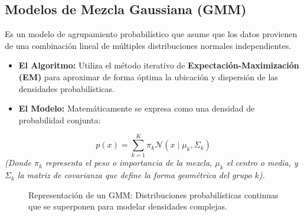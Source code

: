 \subsection{Modelos de Mezcla Gaussiana (GMM)}
Es un modelo de agrupamiento probabilístico que asume que los datos provienen de una combinación lineal de múltiples distribuciones normales independientes.

\begin{itemize}
    \item \textbf{El Algoritmo:} Utiliza el método iterativo de \textbf{Expectación-Maximización (EM)} para aproximar de forma óptima la ubicación y dispersión de las densidades probabilísticas.
    \item \textbf{El Modelo:} Matemáticamente se expresa como una densidad de probabilidad conjunta:
\end{itemize}
\begin{equation}
    p(x) = \sum_{k=1}^{K} \pi_k \mathcal{N}(x \mid \mu_k, \Sigma_k)
\end{equation}
\textit{(Donde $\pi_k$ representa el peso o importancia de la mezcla, $\mu_k$ el centro o media, y $\Sigma_k$ la matriz de covarianza que define la forma geométrica del grupo $k$).}

\begin{figure}[htbp]
    \centering
    \shorthandoff{>}
    \caption{Representación de un GMM: Distribuciones probabilísticas continuas que se superponen para modelar densidades complejas.}
    \label{fig:gmm_plot}
\end{figure}


